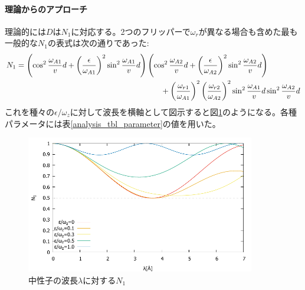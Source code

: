 \paragraph{理論からのアプローチ}
理論的には$D$は$N_1$に対応する。2つのフリッパーで$\omega_r$が異なる場合も含めた最も一般的な$N_1$の表式は次の通りであった:
\begin{align}
&N_1 = \left(\cos^2 \frac{\omega_{A1}}{v}d +\left(\frac{\epsilon}{\omega_{A1}}\right)^2\sin^2 \frac{\omega_{A1}}{v}d\right)\left(\cos^2 \frac{\omega_{A2}}{v}d+\left(\frac{\epsilon}{\omega_{A2}}\right)^2 \sin^2 \frac{\omega_{A2}}{v}d\right)\\ \notag
&\hspace{7cm}+\left(\frac{\omega_{r1}}{\omega_{A1}}\right)^2\left(\frac{\omega_{r2}}{\omega_{A2}}\right)^2 \sin^2 \frac{\omega_{A1}}{v}d \sin^2 \frac{\omega_{A2}}{v}d
\end{align}
これを種々の$\epsilon/\omega_z$に対して波長を横軸として図示すると図\ref{analysis_fig_N1}のようになる。各種パラメータには表\ref{analysis_tbl_parameter}の値を用いた。
\begin{figure}[h]
\centering
\includegraphics[width=10cm]{analysis/D/N1.pdf}
\caption{中性子の波長$\lambda$に対する$N_1$}\label{analysis_fig_N1}
\end{figure}

